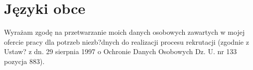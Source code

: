 \documentclass[11pt]{moderncv}
\begin{document}
\section{Języki obce}
\closesection





\footnotesize
Wyrażam zgodę na przetwarzanie moich danych osobowych zawartych w mojej ofercie pracy dla potrzeb niezb?dnych do realizacji procesu rekrutacji (zgodnie z Ustaw? z dn. 29 sierpnia 1997 o Ochronie Danych Osobowych Dz. U. nr 133 pozycja 883).
\end{document}

